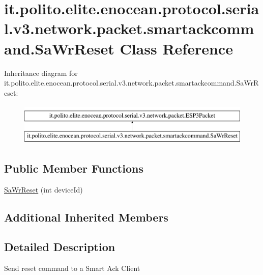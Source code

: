 \hypertarget{classit_1_1polito_1_1elite_1_1enocean_1_1protocol_1_1serial_1_1v3_1_1network_1_1packet_1_1smartackcommand_1_1_sa_wr_reset}{}\section{it.\+polito.\+elite.\+enocean.\+protocol.\+serial.\+v3.\+network.\+packet.\+smartackcommand.\+Sa\+Wr\+Reset Class Reference}
\label{classit_1_1polito_1_1elite_1_1enocean_1_1protocol_1_1serial_1_1v3_1_1network_1_1packet_1_1smartackcommand_1_1_sa_wr_reset}
Inheritance diagram for it.\+polito.\+elite.\+enocean.\+protocol.\+serial.\+v3.\+network.\+packet.\+smartackcommand.\+Sa\+Wr\+Reset\+:\begin{figure}[H]
\begin{center}
\leavevmode
\includegraphics[height=2.000000cm]{classit_1_1polito_1_1elite_1_1enocean_1_1protocol_1_1serial_1_1v3_1_1network_1_1packet_1_1smartackcommand_1_1_sa_wr_reset}
\end{center}
\end{figure}
\subsection*{Public Member Functions}
\begin{DoxyCompactItemize}
\item 
\hyperlink{classit_1_1polito_1_1elite_1_1enocean_1_1protocol_1_1serial_1_1v3_1_1network_1_1packet_1_1smartackcommand_1_1_sa_wr_reset_a1ac1798efd542136bef017a732e8ecdb}{Sa\+Wr\+Reset} (int device\+Id)
\end{DoxyCompactItemize}
\subsection*{Additional Inherited Members}


\subsection{Detailed Description}
Send reset command to a Smart Ack Client

